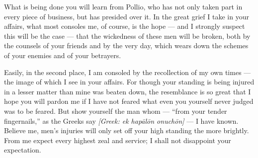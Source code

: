 

 What is being done you will learn from Pollio, who has not only taken part in every piece of business, but has presided over it. In the great grief I take in your affairs, what most consoles me, of course, is the hope --- and I strongly suspect this will be the case --- that the wickedness of these men will be broken, both by the counsels of your friends and by the very day, which wears down the schemes of your enemies and of your betrayers.

 Easily, in the second place, I am consoled by the recollection of my own times --- the image of which I see in your affairs. For though your standing is being injured in a lesser matter than mine was beaten down, the resemblance is so great that I hope you will pardon me if I have not feared what even you yourself never judged was to be feared. But show yourself the man whom --- ``from your tender fingernails,'' as the Greeks say \textit{[Greek: ek hap\=al\=on onuch\=on]} --- I have known. Believe me, men's injuries will only set off your high standing the more brightly. From me expect every highest zeal and service; I shall not disappoint your expectation.
